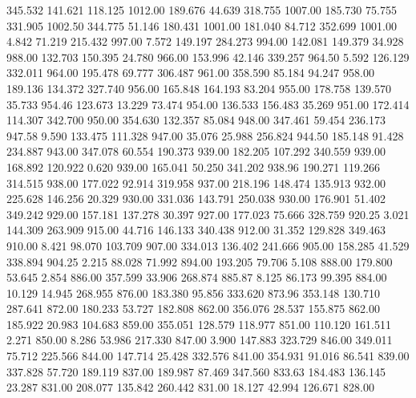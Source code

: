  345.532  141.621  118.125      1012.00
 189.676   44.639  318.755      1007.00
 185.730   75.755  331.905      1002.50
 344.775   51.146  180.431      1001.00
 181.040   84.712  352.699      1001.00
   4.842   71.219  215.432       997.00
   7.572  149.197  284.273       994.00
 142.081  149.379   34.928       988.00
 132.703  150.395   24.780       966.00
 153.996   42.146  339.257       964.50
   5.592  126.129  332.011       964.00
 195.478   69.777  306.487       961.00
 358.590   85.184   94.247       958.00
 189.136  134.372  327.740       956.00
 165.848  164.193   83.204       955.00
 178.758  139.570   35.733       954.46
 123.673   13.229   73.474       954.00
 136.533  156.483   35.269       951.00
 172.414  114.307  342.700       950.00
 354.630  132.357   85.084       948.00
 347.461   59.454  236.173       947.58
   9.590  133.475  111.328       947.00
  35.076   25.988  256.824       944.50
 185.148   91.428  234.887       943.00
 347.078   60.554  190.373       939.00
 182.205  107.292  340.559       939.00
 168.892  120.922    0.620       939.00
 165.041   50.250  341.202       938.96
 190.271  119.266  314.515       938.00
 177.022   92.914  319.958       937.00
 218.196  148.474  135.913       932.00
 225.628  146.256   20.329       930.00
 331.036  143.791  250.038       930.00
 176.901   51.402  349.242       929.00
 157.181  137.278   30.397       927.00
 177.023   75.666  328.759       920.25
   3.021  144.309  263.909       915.00
  44.716  146.133  340.438       912.00
  31.352  129.828  349.463       910.00
   8.421   98.070  103.709       907.00
 334.013  136.402  241.666       905.00
 158.285   41.529  338.894       904.25
   2.215   88.028   71.992       894.00
 193.205   79.706    5.108       888.00
 179.800   53.645    2.854       886.00
 357.599   33.906  268.874       885.87
   8.125   86.173   99.395       884.00
  10.129   14.945  268.955       876.00
 183.380   95.856  333.620       873.96
 353.148  130.710  287.641       872.00
 180.233   53.727  182.808       862.00
 356.076   28.537  155.875       862.00
 185.922   20.983  104.683       859.00
 355.051  128.579  118.977       851.00
 110.120  161.511    2.271       850.00
   8.286   53.986  217.330       847.00
   3.900  147.883  323.729       846.00
 349.011   75.712  225.566       844.00
 147.714   25.428  332.576       841.00
 354.931   91.016   86.541       839.00
 337.828   57.720  189.119       837.00
 189.987   87.469  347.560       833.63
 184.483  136.145   23.287       831.00
 208.077  135.842  260.442       831.00
  18.127   42.994  126.671       828.00
